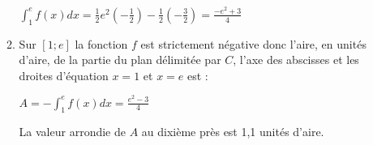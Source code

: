 \begin{corrige}
\begin{enumerate}
\begin{enumerate}[label=\alph*.]
               \par
               $\int_{1}^{e}f\left(x\right)dx=\frac{1}{2}e^{2}\left(-\frac{1}{2}\right)-\frac{1}{2}\left(-\frac{3}{2}\right)=\frac{-e^{2}+3}{4}$
               \item
               Sur $\left[1; e\right]$ la fonction $f$ est strictement négative donc l'aire, en unités d'aire, de la partie du plan délimitée par $C$, l'axe des abscisses et les droites d'équation $x=1$ et $x=e$ est :
               \par
               $A=-\int_{1}^{e}f\left(x\right)dx=\frac{e^{2}-3}{4}$
               \par
               La valeur arrondie de $A$ au dixième près est 1,1 unités d'aire.
          \end{enumerate}
     \end{enumerate}
\end{corrige}
